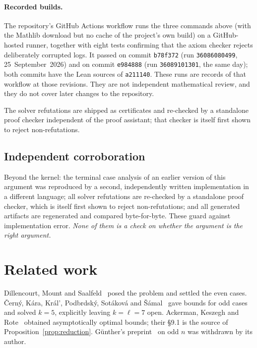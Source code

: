 \documentclass[11pt,a4paper]{article}
\theoremstyle{plain}
\theoremstyle{definition}
\theoremstyle{remark}
\begin{document}
\paragraph{Recorded builds.} The repository's GitHub Actions workflow runs the
three commands above (with the Mathlib download but no cache of the project's
own build) on a GitHub-hosted runner, together with eight tests confirming
that the axiom checker rejects deliberately corrupted logs. It passed on
commit \texttt{b78f372} (run \texttt{36086080499}, 25~September~2026) and on
commit \texttt{e984888} (run \texttt{36089101301}, the same day); both
commits have the Lean sources of \texttt{a211140}. These runs are records of
that workflow at those revisions. They are not independent mathematical
review, and they do not cover later changes to the repository.

The solver refutations are shipped as certificates and re-checked by a
standalone proof checker independent of the proof assistant; that checker is
itself first shown to reject non-refutations.

\subsection{Independent corroboration}

Beyond the kernel: the terminal case analysis of an earlier version of this
argument was reproduced by a second, independently written implementation in a
different language; all solver refutations are re-checked by a standalone
proof checker, which is itself first shown to reject non-refutations; and all
generated artifacts are regenerated and compared byte-for-byte. These guard
against implementation error. \emph{None of them is a check on whether the
argument is the right argument.}

\section{Related work}\label{sec:related}

Dillencourt, Mount and Saalfeld~\cite{DillencourtMountSaalfeld1993} posed the
problem and settled the even cases. \v{C}ern\'y, K\'ara, Kr\'al', Podbrdsk\'y, Sot\'akov\'a and
\v{S}\'amal~\cite{CernyEtAl2003} gave bounds for odd cases and solved $k=5$,
explicitly leaving $k=\ell=7$ open. Ackerman, Keszegh and
Rote~\cite{AckermanKeszeghRote2022} obtained asymptotically optimal bounds;
their \S9.1 is the source of Proposition~\ref{prop:reduction}. G\"unther's preprint~\cite{Gunther2012} on odd $n$
was withdrawn by its author.
\end{document}

